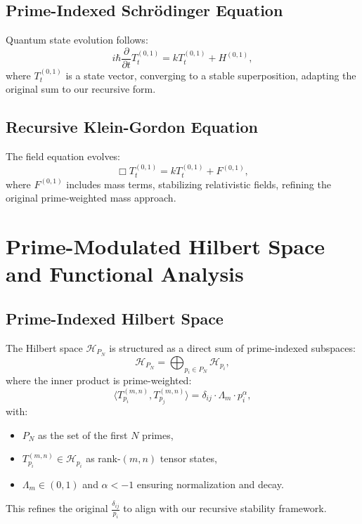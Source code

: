 \documentclass{article}
\theoremstyle{plain}
\begin{document}
\subsection{Prime-Indexed Schrödinger Equation}
Quantum state evolution follows:
\begin{equation}
    i\hbar \frac{\partial}{\partial t} T_t^{(0,1)} = k T_t^{(0,1)} + H^{(0,1)},
\end{equation}
where \( T_t^{(0,1)} \) is a state vector, converging to a stable superposition, adapting the original sum to our recursive form.

\subsection{Recursive Klein-Gordon Equation}
The field equation evolves:
\begin{equation}
    \Box T_t^{(0,1)} = k T_t^{(0,1)} + F^{(0,1)},
\end{equation}
where \( F^{(0,1)} \) includes mass terms, stabilizing relativistic fields, refining the original prime-weighted mass approach.

\section{Prime-Modulated Hilbert Space and Functional Analysis}

\subsection{Prime-Indexed Hilbert Space}
The Hilbert space \( \mathcal{H}_{P_N} \) is structured as a direct sum of prime-indexed subspaces:
\begin{equation}
    \mathcal{H}_{P_N} = \bigoplus_{p_i \in P_N} \mathcal{H}_{p_i},
\end{equation}
where the inner product is prime-weighted:
\begin{equation}
    \langle T_{p_i}^{(m,n)}, T_{p_j}^{(m,n)} \rangle = \delta_{ij} \cdot \Lambda_m \cdot p_i^\alpha,
\end{equation}
with:
\begin{itemize}
    \item \( P_N \) as the set of the first \( N \) primes,
    \item \( T_{p_i}^{(m,n)} \in \mathcal{H}_{p_i} \) as rank-$(m,n)$ tensor states,
    \item \( \Lambda_m \in (0, 1) \) and \( \alpha < -1 \) ensuring normalization and decay.
\end{itemize}
This refines the original \( \frac{\delta_{ij}}{p_i} \) to align with our recursive stability framework.
\end{document}
